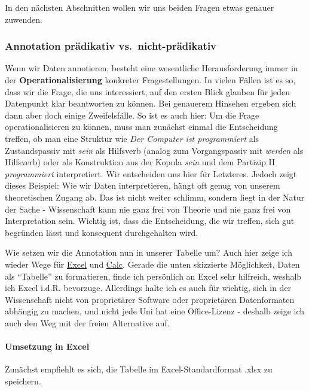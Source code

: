 \documentclass[]{article}
\let\oldparagraph\paragraph
\renewcommand{\paragraph}[1]{\oldparagraph{#1}\mbox{}}
\begin{document}
In den nächsten Abschnitten wollen wir uns beiden Fragen etwas genauer
zuwenden.

\subsubsection{Annotation prädikativ
vs.~nicht-prädikativ}\label{annotation-pradikativ-vs.nicht-pradikativ}

Wenn wir Daten annotieren, besteht eine wesentliche Herausforderung
immer in der \textbf{Operationalisierung} konkreter Fragestellungen. In
vielen Fällen ist es so, dass wir die Frage, die uns interessiert, auf
den ersten Blick glauben für jeden Datenpunkt klar beantworten zu
können. Bei genauerem Hinsehen ergeben sich dann aber doch einige
Zweifelsfälle. So ist es auch hier: Um die Frage operationalisieren zu
können, muss man zunächst einmal die Entscheidung treffen, ob man eine
Struktur wie \emph{Der Computer ist programmiert} als Zustandspassiv mit
\emph{sein} als Hilfsverb (analog zum Vorgangspassiv mit \emph{werden}
als Hilfsverb) oder als Konstruktion aus der Kopula \emph{sein} und dem
Partizip II \emph{programmiert} interpretiert. Wir entscheiden uns hier
für Letzteres. Jedoch zeigt dieses Beispiel: Wie wir Daten
interpretieren, hängt oft genug von unserem theoretischen Zugang ab. Das
ist nicht weiter schlimm, sondern liegt in der Natur der Sache -
Wissenschaft kann nie ganz frei von Theorie und nie ganz frei von
Interpretation sein. Wichtig ist, dass die Entscheidung, die wir
treffen, sich gut begründen lässt und konsequent durchgehalten wird.

Wie setzen wir die Annotation nun in unserer Tabelle um? Auch hier zeige
ich wieder Wege für \protect\hyperlink{umsetzung-in-excel}{Excel} und
\protect\hyperlink{umsetzung-in-calc}{Calc}. Gerade die unten skizzierte
Möglichkeit, Daten als ``Tabelle'' zu formatieren, finde ich persönlich
an Excel sehr hilfreich, weshalb ich Excel i.d.R. bevorzuge. Allerdings
halte ich es auch für wichtig, sich in der Wissenschaft nicht von
proprietärer Software oder proprietären Datenformaten abhängig zu
machen, und nicht jede Uni hat eine Office-Lizenz - deshalb zeige ich
auch den Weg mit der freien Alternative auf.

\hypertarget{umsetzung-in-excel}{\paragraph{Umsetzung in
Excel}\label{umsetzung-in-excel}}

Zunächst empfiehlt es sich, die Tabelle im Excel-Standardformat .xlsx zu
speichern.
\end{document}
